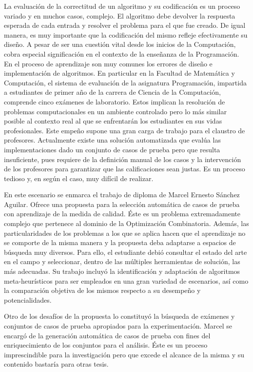 \documentclass[a4paper,openright,11pt,oneside]{book}
\begin{document}
	La evaluación de la correctitud de un algoritmo y su codificación es un proceso variado y en muchos casos, complejo. El algoritmo debe devolver la respuesta esperada de cada entrada y resolver el problema para el que fue creado. De igual manera, es muy importante que la codificación del mismo refleje efectivamente su diseño. A pesar de ser una cuestión vital desde los inicios de la Computación, cobra especial significación en el contexto de la enseñanza de la Programación. En el proceso de aprendizaje son muy comunes los errores de diseño e implementación de algoritmos. En particular en la Facultad de Matemática y Computación, el sistema de evaluación de la asignatura Programación, impartida a estudiantes de primer año de la carrera de Ciencia de la Computación, comprende cinco exámenes de laboratorio. Estos implican la resolución de problemas computacionales en un ambiente controlado pero lo más similar posible al contexto real al que se enfrentarán los estudiantes en sus vidas profesionales. Este empeño supone una gran carga de trabajo para el claustro de profesores. Actualmente existe una solución automatizada que evalúa las implementaciones dado un conjunto de casos de prueba pero que resulta insuficiente, pues requiere de la definición manual de los casos y la intervención de los profesores para garantizar que las calificaciones sean justas. Es un proceso tedioso y, en según el caso, muy difícil de realizar.
	
	En este escenario se enmarca el trabajo de diploma de Marcel Ernesto Sánchez Aguilar. Ofrece una propuesta para la selección automática de casos de prueba con aprendizaje de la medida de calidad. Éste es un problema extremadamente complejo que pertenece al dominio de la Optimización Combinatoria. Además, las particularidades de los problemas a los que se aplica hacen que el aprendizaje no se comporte de la misma manera y la propuesta deba adaptarse a espacios de búsqueda muy diversos. Para ello, el estudiante debió consultar el estado del arte en el campo y seleccionar, dentro de las múltiples herramientas de solución, las más adecuadas. Su trabajo incluyó la identificación y adaptación de algoritmos meta-heurísticos para ser empleados en una gran variedad de escenarios, así como la comparación objetiva de los mismos respecto a su desempeño y potencialidades.
	
	
	Otro de los desafíos de la propuesta lo constituyó la búsqueda de exámenes y conjuntos de casos de prueba apropiados para la experimentación. Marcel se encargó de la generación automática de casos de prueba con fines del enriquecimiento de los conjuntos para el análisis. Éste es un proceso imprescindible para la investigación pero que excede el alcance de la misma y su contenido bastaría para otras tesis. 
\end{document}
